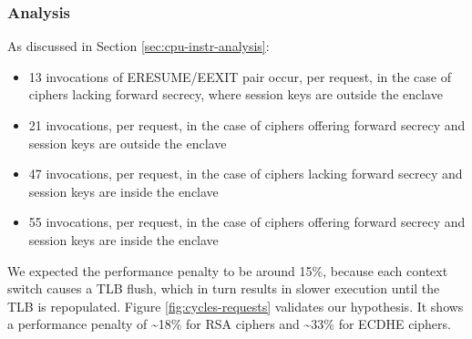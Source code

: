 \documentclass[../../../main.tex]{subfiles}
\begin{document}
\subsubsection*{Analysis}
As discussed in Section \ref{sec:cpu-instr-analysis}:
\begin{itemize}
  \item 13 invocations of ERESUME/EEXIT pair occur, per request, in
    the case of ciphers lacking forward secrecy, where session keys are
    outside the enclave
  \item 21 invocations, per request, in the case of ciphers offering
    forward secrecy and session keys are outside the enclave
  \item 47 invocations, per request, in the case of ciphers lacking
    forward secrecy and session keys are inside the enclave
  \item 55 invocations, per request, in the case of ciphers offering
    forward secrecy and session keys are inside the enclave
\end{itemize}
We expected the performance penalty to be around 15\%, because each
context switch causes a TLB flush, which in turn results in slower
execution until the TLB is repopulated. Figure
\ref{fig:cycles-requests} validates our hypothesis. It shows a
performance penalty of \textasciitilde18\% for RSA ciphers and
\textasciitilde33\% for ECDHE ciphers.

\end{document}
